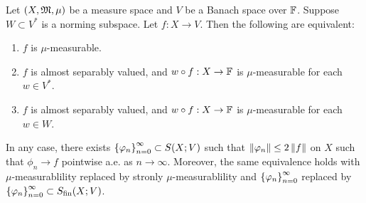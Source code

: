 \documentclass[a4paper]{article}
\begin{document}
\begin{thm}[Pettis]
  Let $(X, \mathfrak{M}, \mu)$ be a measure space and $V$ be a 
  Banach space over $\mathbb{F}$. Suppose $W \subset V^*$ is a 
  norming subspace. Let $f: X \to V$. Then the following
  are equivalent:
  \begin{enumerate}
    \item $f$ is $\mu$-measurable.
    \item $f$ is almost separably valued, and $w \circ
    f : X \to \mathbb{F}$ is $\mu$-measurable for each $w \in V^*$.
    \item $f$ is almost separably valued, and $w \circ f: 
    X \to \mathbb{F}$ is $\mu$-measurable for each $w \in W$.
  \end{enumerate}
  In any case, there exists $\left\{ \varphi_n \right\}_{n=0}^\infty \subset S(X; V)
  $ such that $\left\lVert \varphi_n\right\rVert \leq 2 \left\lVert f\right\rVert$ on $X$ such that 
  $\phi_n \to f$ pointwise a.e. as $n \to \infty$. 
  Moreover, the same 
  equivalence holds with $\mu$-measurablility replaced by 
  stronly $\mu$-measurablility and $\left\{ \varphi_n \right\}_{n=0}^\infty$  
  replaced by $\left\{ \varphi_n \right\}_{n=0}^\infty \subset S_{\text{fin}}(X; V)$.
\end{thm}
\end{document}
